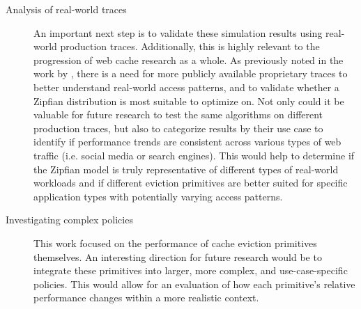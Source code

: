 \begin{description}
    \item[Analysis of real-world traces]
    An important next step is to validate these simulation results using real-world production traces. Additionally, this is highly relevant to the progression of web cache research as a whole. As previously noted in the work by \citeauthor{twitter-analysis} \cite{twitter-analysis}, there is a need for more publicly available proprietary traces to better understand real-world access patterns, and to validate whether a Zipfian distribution is most suitable to optimize on. Not only could it be valuable for future research to test the same algorithms on different production traces, but also to categorize results by their use case to identify if performance trends are consistent across various types of web traffic (i.e. social media or search engines). This would help to determine if the Zipfian model is truly representative of different types of real-world workloads and if different eviction primitives are better suited for specific application types with potentially varying access patterns.


    \item[Investigating complex policies]
    This work focused on the performance of cache eviction primitives themselves. An interesting direction for future research would be to integrate these primitives into larger, more complex, and use-case-specific policies. This would allow for an evaluation of how each primitive's relative performance changes within a more realistic context.
    
\end{description}




